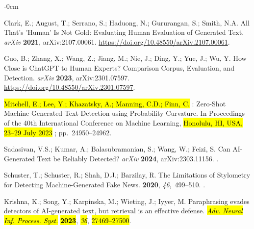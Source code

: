 \documentclass[electronics,article,accept,pdftex,moreauthors,electronics]{Definitions/mdpi}
\begin{document}
\begin{adjustwidth}{-\extralength}{0cm}
\begin{thebibliography}{999}
Clark, E.; August, T.; Serrano, S.; Haduong, N.; Gururangan, S.; Smith, N.A.
\newblock All {That}'s '{Human}' {Is} {Not} {Gold}: {Evaluating} {Human}
  {Evaluation} of {Generated} {Text}. \emph{arXiv} \textbf{2021}, arXiv:2107.00061.
  {\url{https://doi.org/10.48550/arXiv.2107.00061}}.

Guo, B.; Zhang, X.; Wang, Z.; Jiang, M.; Nie, J.; Ding, Y.; Yue, J.; Wu, Y.
\newblock How {Close} is {ChatGPT} to {Human} {Experts}? {Comparison} {Corpus},
  {Evaluation}, and {Detection}. \emph{arXiv} \textbf{2023}, arXiv:2301.07597.
  {\url{https://doi.org/10.48550/arXiv.2301.07597}}.

\hl{Mitchell, E.; Lee, Y.; Khazatsky, A.; Manning, C.D.; Finn, C.} %
: {Zero}-{Shot} {Machine}-{Generated} {Text} {Detection}
  using {Probability} {Curvature}.
\newblock In Proceedings of the 40th {International} {Conference} on {Machine} {Learning},  \hl{Honolulu, HI, USA, 23--29 July 2023}%
; pp.~24950--24962.


Sadasivan, V.S.; Kumar, A.; Balasubramanian, S.; Wang, W.; Feizi, S.
\newblock Can {AI}-{Generated} {Text} be {Reliably} {Detected}? \emph{arXiv} \textbf{2024}, arXiv:2303.11156.
.

Schuster, T.; Schuster, R.; Shah, D.J.; Barzilay, R.
\newblock The {Limitations} of {Stylometry} for {Detecting}
  {Machine}-{Generated} {Fake} {News}.
 {\bf 2020}, {\em 46},~499--510.
.

Krishna, K.; Song, Y.; Karpinska, M.; Wieting, J.; Iyyer, M.
\newblock Paraphrasing evades detectors of {AI}-generated text, but retrieval
  is an effective defense. \emph{\hl{Adv. Neural Inf. Process. Syst.}} \textbf{\hl{2023}}, \emph{\hl{36}}, \hl{27469--27500}.



\end{thebibliography}
\end{adjustwidth}
\end{document}
